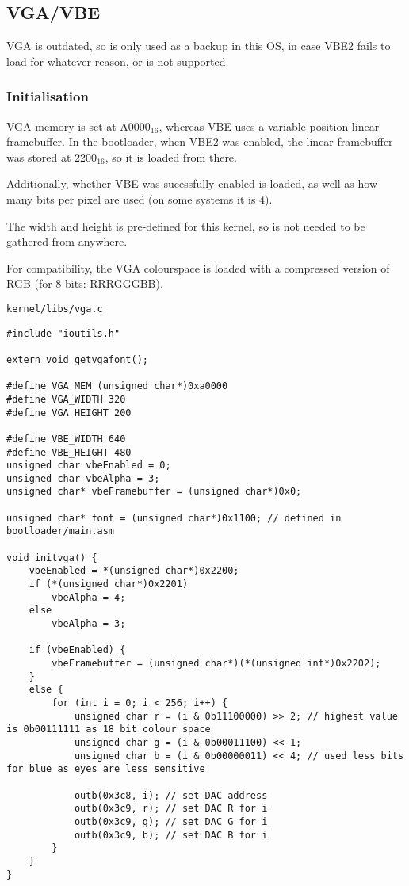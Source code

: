 \documentclass{article}
\begin{document}
\subsection{VGA/VBE}

VGA is outdated, so is only used as a backup in this OS, in case VBE2 fails
to load for whatever reason, or is not supported.

\subsubsection{Initialisation}

VGA memory is set at A0000$_{16}$, whereas VBE uses a variable position
linear framebuffer. In the bootloader, when VBE2 was enabled, the linear
framebuffer was stored at 2200$_{16}$, so it is loaded from there.

Additionally, whether VBE was sucessfully enabled is loaded, as well as
how many bits per pixel are used (on some systems it is 4).

The width and height is pre-defined for this kernel, so is not needed
to be gathered from anywhere.

For compatibility, the VGA colourspace is loaded with a compressed version
of RGB (for 8 bits: RRRGGGBB).

\begin{verbatim}
kernel/libs/vga.c
\end{verbatim}
\begin{verbatim}
#include "ioutils.h"

extern void getvgafont();

#define VGA_MEM (unsigned char*)0xa0000
#define VGA_WIDTH 320
#define VGA_HEIGHT 200

#define VBE_WIDTH 640
#define VBE_HEIGHT 480
unsigned char vbeEnabled = 0;
unsigned char vbeAlpha = 3;
unsigned char* vbeFramebuffer = (unsigned char*)0x0;

unsigned char* font = (unsigned char*)0x1100; // defined in bootloader/main.asm

void initvga() {
	vbeEnabled = *(unsigned char*)0x2200;
	if (*(unsigned char*)0x2201)
		vbeAlpha = 4;
	else
		vbeAlpha = 3;

	if (vbeEnabled) {
		vbeFramebuffer = (unsigned char*)(*(unsigned int*)0x2202);
	}
	else {
		for (int i = 0; i < 256; i++) {
			unsigned char r = (i & 0b11100000) >> 2; // highest value is 0b00111111 as 18 bit colour space
			unsigned char g = (i & 0b00011100) << 1;
			unsigned char b = (i & 0b00000011) << 4; // used less bits for blue as eyes are less sensitive

			outb(0x3c8, i); // set DAC address
			outb(0x3c9, r); // set DAC R for i
			outb(0x3c9, g); // set DAC G for i
			outb(0x3c9, b); // set DAC B for i
		}
	}
}
\end{verbatim}
\end{document}

